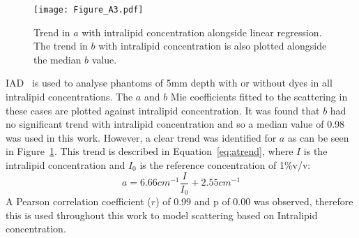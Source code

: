 \begin{figure}[h!]
    \centering
    \texttt{[image: Figure\_A3.pdf]}
    \caption{Trend in $a$ with intralipid concentration alongside linear regression. The trend in $b$ with intralipid concentration is also plotted alongside the median $b$ value.}
 \label{fig:atrend}
\end{figure}

IAD~\citep{Prahl2017} is used to analyse phantoms of 5mm depth with or without dyes in all intralipid concentrations. The $a$ and $b$ Mie coefficients fitted to the scattering in these cases are plotted against intralipid concentration. It was found that $b$ had no significant trend with intralipid concentration and so a median value of 0.98 was used in this work.
However, a clear trend was identified for $a$ as can be seen in Figure~\ref{fig:atrend}. 
This trend is described in Equation~\eqref{eq:atrend}, where $I$ is the intralipid concentration and $I_0$ is the reference concentration of 1\%v/v: 
\begin{equation}
    a = 6.66cm^{-1}\frac{I}{I_0} + 2.55cm^{-1}
    \label{eq:atrend}
\end{equation}
A Pearson correlation coefficient ($r$) of 0.99 and p of 0.00 was observed, therefore this is used throughout this work to model scattering based on Intralipid concentration.

